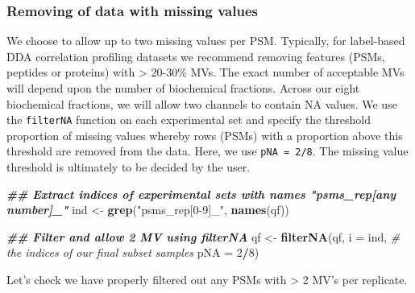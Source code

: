 \documentclass[9pt,a4paper,]{extarticle}
\newenvironment{Shaded}{\begin{snugshade}}{\end{snugshade}}
\newcommand{\AttributeTok}[1]{\textcolor[rgb]{0.13,0.29,0.53}{#1}}
\newcommand{\CommentTok}[1]{\textcolor[rgb]{0.56,0.35,0.01}{\textit{#1}}}
\newcommand{\ControlFlowTok}[1]{\textcolor[rgb]{0.13,0.29,0.53}{\textbf{#1}}}
\newcommand{\DecValTok}[1]{\textcolor[rgb]{0.00,0.00,0.81}{#1}}
\newcommand{\DocumentationTok}[1]{\textcolor[rgb]{0.56,0.35,0.01}{\textbf{\textit{#1}}}}
\newcommand{\FunctionTok}[1]{\textcolor[rgb]{0.13,0.29,0.53}{\textbf{#1}}}
\newcommand{\NormalTok}[1]{#1}
\newcommand{\OtherTok}[1]{\textcolor[rgb]{0.56,0.35,0.01}{#1}}
\newcommand{\SpecialCharTok}[1]{\textcolor[rgb]{0.81,0.36,0.00}{\textbf{#1}}}
\newcommand{\StringTok}[1]{\textcolor[rgb]{0.31,0.60,0.02}{#1}}
\begin{document}
\subsubsection{Removing of data with missing values}\label{removing-of-data-with-missing-values}

We choose to allow up to two missing values per PSM. Typically, for label-based
DDA correlation profiling datasets we recommend removing features (PSMs, peptides
or proteins) with \textgreater{} 20-30\% MVs. The exact number of acceptable MVs will depend
upon the number of biochemical fractions. Across our eight biochemical fractions,
we will allow two channels to contain NA values. We use the \texttt{filterNA} function
on each experimental set and specify the threshold proportion of missing values
whereby rows (PSMs) with a proportion above this threshold are removed from the
data. Here, we use \texttt{pNA\ =\ 2/8}. The missing value threshold is ultimately to be
decided by the user.

\begin{Shaded}
\begin{Highlighting}[]
\DocumentationTok{\#\# Extract indices of experimental sets with names "psms\_rep[any number]\_"}
\NormalTok{ind }\OtherTok{\textless{}{-}} \FunctionTok{grep}\NormalTok{(}\StringTok{"psms\_rep[0{-}9]\_"}\NormalTok{, }\FunctionTok{names}\NormalTok{(qf))}

\DocumentationTok{\#\# Filter and allow 2 MV using filterNA}
\NormalTok{qf }\OtherTok{\textless{}{-}} \FunctionTok{filterNA}\NormalTok{(qf, }
               \AttributeTok{i =}\NormalTok{ ind,       }\CommentTok{\# the indices of our final subset samples}
               \AttributeTok{pNA =} \DecValTok{2}\SpecialCharTok{/}\DecValTok{8}\NormalTok{)}
\end{Highlighting}
\end{Shaded}

Let's check we have properly filtered out any PSMs with \textgreater{} 2 MV's per replicate.

\begin{Shaded}
\end{Shaded}
\end{document}
